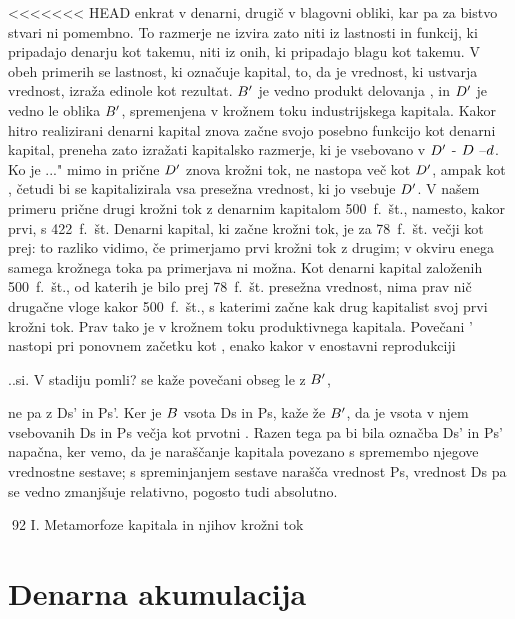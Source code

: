 \documentclass[kapital_02.tex]{subfiles}
\begin{document}
<<<<<<< HEAD
 enkrat v denarni, drugič v blagovni obliki, kar pa za bistvo stvari ni pomembno. To razmerje ne izvira zato niti iz lastnosti in funkcij, ki pripadajo denarju kot takemu, niti iz onih, ki pripadajo blagu kot takemu. V obeh primerih se lastnost, ki označuje kapital, to, da je vrednost, ki ustvarja vrednost, izraža edinole kot rezultat. \( B' \) je vedno produkt delovanja \KPEP, in \( D' \) je vedno le oblika \( B' \), spremenjena v krožnem toku industrijskega kapitala. Kakor hitro realizirani denarni kapital znova začne svojo posebno funkcijo kot denarni kapital, preneha zato izražati kapitalsko razmerje, ki je vsebovano v \( D' \) - \( D \) --\( d \). Ko je \KPED...\KPED" mimo in prične \( D' \) znova krožni tok, ne nastopa več kot \( D' \), ampak kot \KPED, četudi bi se kapitalizirala vsa presežna vrednost, ki jo vsebuje \( D' \). V našem primeru prične drugi krožni tok z denarnim kapitalom 500~f.~št., namesto, kakor prvi, s 422~f.~št. Denarni kapital, ki začne krožni tok, je za 78~f.~št. večji kot prej: to razliko vidimo, če primerjamo prvi krožni tok z drugim; v okviru enega samega krožnega toka pa primerjava ni možna. Kot denarni kapital založenih 500~f.~št., od katerih je bilo prej 78~f.~št. presežna vrednost, nima prav nič drugačne vloge kakor 500~f.~št., s katerimi začne kak drug kapitalist svoj prvi krožni tok. Prav tako je v krožnem toku produktivnega kapitala. Povečani \KPEP' nastopi pri ponovnem začetku kot \KPEP, enako kakor \KPEP v enostavni reprodukciji

\KPEP..si. V stadiju pomli? se kaže povečani obseg le z \( B' \),

ne pa z Ds' in Ps'. Ker je \( B \) vsota Ds in Ps, kaže že \( B' \), da je vsota v njem vsebovanih Ds in Ps večja kot prvotni \KPEP. Razen tega pa bi bila označba Ds' in Ps' napačna, ker vemo, da je naraščanje kapitala povezano s spremembo njegove vrednostne sestave; s spreminjanjem sestave narašča vrednost Ps, vrednost Ds pa se vedno zmanjšuje relativno, pogosto tudi absolutno.



92 I. Metamorfoze kapitala in njihov krožni tok



\section{Denarna akumulacija}
\end{document}

